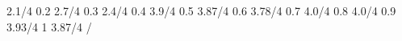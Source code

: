 \begin{sparkline}{5}
	 2.1/4 0.2 2.7/4 0.3 2.4/4 0.4 3.9/4 0.5 3.87/4 0.6 3.78/4 0.7 4.0/4 0.8 4.0/4 0.9 3.93/4 1 3.87/4 /
\end{sparkline}
